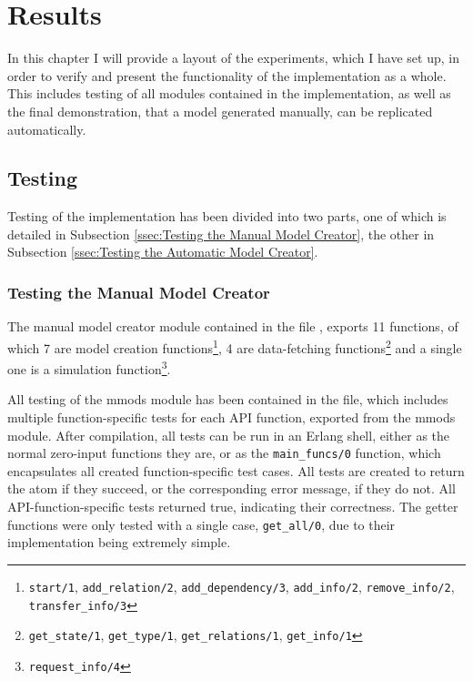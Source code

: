 \chapter{Results}

In this chapter I will provide a layout of the experiments, which I have set up, in order to verify and present the functionality of the implementation as a whole. This includes testing of all modules contained in the implementation, as well as the final demonstration, that a model generated manually, can be replicated automatically.

\section{Testing}

Testing of the implementation has been divided into two parts, one of which is detailed in Subsection \ref{ssec:Testing the Manual Model Creator}, the other in Subsection \ref{ssec:Testing the Automatic Model Creator}.

\subsection{Testing the Manual Model Creator}
The manual model creator module contained in the file , exports 11 functions, of which 7 are model creation functions\footnote{\lstinline{start/1}, \lstinline{add_relation/2}, \lstinline{add_dependency/3}, \lstinline{add_info/2}, \lstinline{remove_info/2}, \lstinline{transfer_info/3}}, 4 are data-fetching functions\footnote{\lstinline{get_state/1}, \lstinline{get_type/1}, \lstinline{get_relations/1}, \lstinline{get_info/1}} and a single one is a simulation function\footnote{\lstinline{request_info/4}}.

All testing of the mmods module has been contained in the  file, which includes multiple function-specific tests for each API function, exported from the mmods module. After compilation, all tests can be run in an Erlang shell, either as the normal zero-input functions they are, or as the \linebreak \lstinline{main_funcs/0} function, which encapsulates all created function-specific test cases. All tests are created to return the atom  if they succeed, or the corresponding error message, if they do not. All API-function-specific tests returned true, indicating their correctness. The getter functions were only tested with a single case, \lstinline{get_all/0}, due to their implementation being extremely simple.

